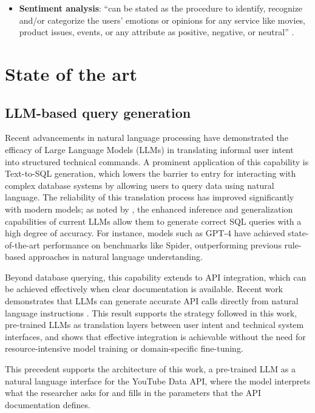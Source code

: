 \begin{itemize}
    \item \textbf{Sentiment analysis}: \enquote{can be stated as the procedure to identify, recognize and/or categorize the users' emotions or opinions for any service like movies, product issues, events, or any attribute as positive, negative, or neutral} \autocite{bordoloi2023sentiment}.

\end{itemize}

\section{State of the art}

\subsection{LLM-based query generation}

Recent advancements in natural language processing have demonstrated the efficacy of Large Language Models (LLMs) in translating informal user intent into structured technical commands. A prominent application of this capability is Text-to-SQL generation, which lowers the barrier to entry for interacting with complex database systems by allowing users to query data using natural language. The reliability of this translation process has improved significantly with modern models; as noted by \textcite{zhu2024largelanguagemodelenhanced}, the enhanced inference and generalization capabilities of current LLMs allow them to generate correct SQL queries with a high degree of accuracy. For instance, models such as GPT-4 have achieved state-of-the-art performance on benchmarks like Spider, outperforming previous rule-based approaches in natural language understanding.

Beyond database querying, this capability extends to API integration, which can be achieved effectively when clear documentation is available. Recent work demonstrates that LLMs can generate accurate API calls directly from natural language instructions \autocite{tesfagiorgis2023large}. This result supports the strategy followed in this work, pre-trained LLMs as translation layers between user intent and technical system interfaces, and shows that effective integration is achievable without the need for resource-intensive model training or domain-specific fine-tuning.

This precedent supports the architecture of this work, a pre-trained LLM as a natural language interface for the YouTube Data API, where the model interprets what the researcher asks for and fills in the parameters that the API documentation defines.

